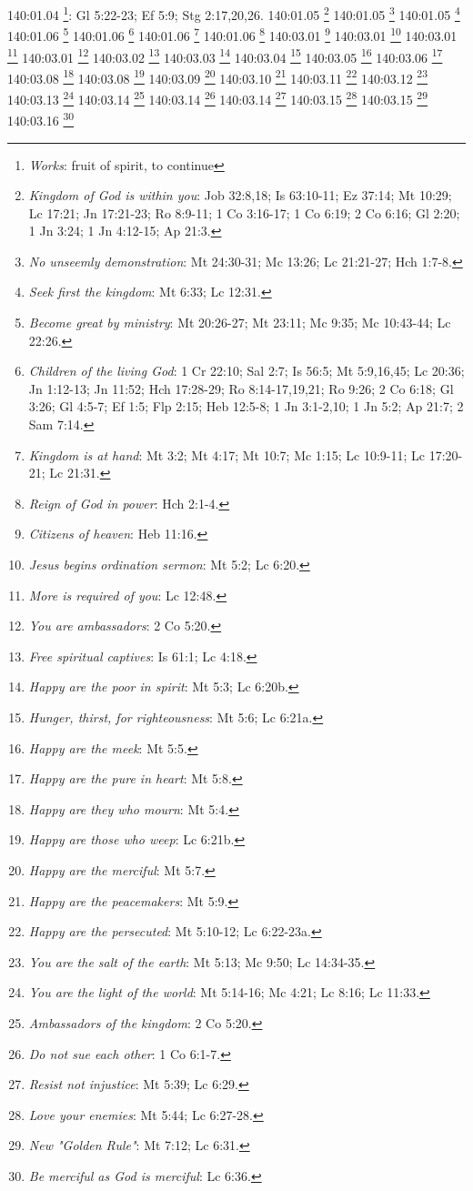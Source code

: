 {{{{140:01.04 \footnote{\textit{Works}: fruit of spirit, to continue}: Gl 5:22-23; Ef 5:9; Stg 2:17,20,26.}
140:01.05 \footnote{\textit{Kingdom of God is within you}: Job 32:8,18; Is 63:10-11; Ez 37:14; Mt 10:29; Lc 17:21; Jn 17:21-23; Ro 8:9-11; 1 Co 3:16-17; 1 Co 6:19; 2 Co 6:16; Gl 2:20; 1 Jn 3:24; 1 Jn 4:12-15; Ap 21:3.}
140:01.05 \footnote{\textit{No unseemly demonstration}: Mt 24:30-31; Mc 13:26; Lc 21:21-27; Hch 1:7-8.}
140:01.05 \footnote{\textit{Seek first the kingdom}: Mt 6:33; Lc 12:31.}
140:01.06 \footnote{\textit{Become great by ministry}: Mt 20:26-27; Mt 23:11; Mc 9:35; Mc 10:43-44; Lc 22:26.}
140:01.06 \footnote{\textit{Children of the living God}: 1 Cr 22:10; Sal 2:7; Is 56:5; Mt 5:9,16,45; Lc 20:36; Jn 1:12-13; Jn 11:52; Hch 17:28-29; Ro 8:14-17,19,21; Ro 9:26; 2 Co 6:18; Gl 3:26; Gl 4:5-7; Ef 1:5; Flp 2:15; Heb 12:5-8; 1 Jn 3:1-2,10; 1 Jn 5:2; Ap 21:7; 2 Sam 7:14.}
140:01.06 \footnote{\textit{Kingdom is at hand}: Mt 3:2; Mt 4:17; Mt 10:7; Mc 1:15; Lc 10:9-11; Lc 17:20-21; Lc 21:31.}
140:01.06 \footnote{\textit{Reign of God in power}: Hch 2:1-4.}
140:03.01 \footnote{\textit{Citizens of heaven}: Heb 11:16.}
140:03.01 \footnote{\textit{Jesus begins ordination sermon}: Mt 5:2; Lc 6:20.}
140:03.01 \footnote{\textit{More is required of you}: Lc 12:48.}
140:03.01 \footnote{\textit{You are ambassadors}: 2 Co 5:20.}
140:03.02 \footnote{\textit{Free spiritual captives}: Is 61:1; Lc 4:18.}
140:03.03 \footnote{\textit{Happy are the poor in spirit}: Mt 5:3; Lc 6:20b.}
140:03.04 \footnote{\textit{Hunger, thirst, for righteousness}: Mt 5:6; Lc 6:21a.}
140:03.05 \footnote{\textit{Happy are the meek}: Mt 5:5.}
140:03.06 \footnote{\textit{Happy are the pure in heart}: Mt 5:8.}
140:03.08 \footnote{\textit{Happy are they who mourn}: Mt 5:4.}
140:03.08 \footnote{\textit{Happy are those who weep}: Lc 6:21b.}
140:03.09 \footnote{\textit{Happy are the merciful}: Mt 5:7.}
140:03.10 \footnote{\textit{Happy are the peacemakers}: Mt 5:9.}
140:03.11 \footnote{\textit{Happy are the persecuted}: Mt 5:10-12; Lc 6:22-23a.}
140:03.12 \footnote{\textit{You are the salt of the earth}: Mt 5:13; Mc 9:50; Lc 14:34-35.}
140:03.13 \footnote{\textit{You are the light of the world}: Mt 5:14-16; Mc 4:21; Lc 8:16; Lc 11:33.}
140:03.14 \footnote{\textit{Ambassadors of the kingdom}: 2 Co 5:20.}
140:03.14 \footnote{\textit{Do not sue each other}: 1 Co 6:1-7.}
140:03.14 \footnote{\textit{Resist not injustice}: Mt 5:39; Lc 6:29.}
140:03.15 \footnote{\textit{Love your enemies}: Mt 5:44; Lc 6:27-28.}
140:03.15 \footnote{\textit{New "Golden Rule"}: Mt 7:12; Lc 6:31.}
140:03.16 \footnote{\textit{Be merciful as God is merciful}: Lc 6:36.}
}}}
